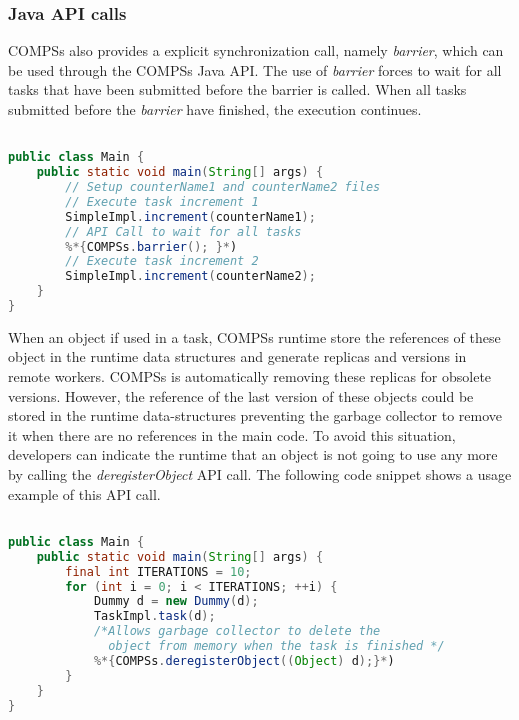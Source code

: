\subsubsection{Java API calls}

COMPSs also provides a explicit synchronization call, namely \textit{barrier}, which can be used through the COMPSs Java API.
The use of \textit{barrier} forces to wait for all tasks that have been submitted before the barrier is called.
When all tasks submitted before the \textit{barrier} have finished, the execution continues.

\begin{lstlisting}[language=java]
%*{\bf import es.bsc.compss.api.COMPSs;}*)

public class Main {
    public static void main(String[] args) {
        // Setup counterName1 and counterName2 files
        // Execute task increment 1
        SimpleImpl.increment(counterName1);
        // API Call to wait for all tasks
        %*{COMPSs.barrier(); }*)
        // Execute task increment 2
        SimpleImpl.increment(counterName2);
    }
}
\end{lstlisting}

When an object if used in a task, COMPSs runtime store the references of these object in the runtime data structures and generate replicas and versions in remote workers. 
COMPSs is automatically removing these replicas for obsolete versions. 
However, the reference of the last version of these objects could be stored in the runtime data-structures preventing the garbage collector to remove it when there are no references in the main code. 
To avoid this situation, developers can indicate the runtime that an object is not going to use any more by calling the \textit{deregisterObject} API call.
The following code snippet shows a usage example of this API call. 

\begin{lstlisting}[language=java]
%*{\bf import es.bsc.compss.api.COMPSs;}*)

public class Main {
    public static void main(String[] args) {
        final int ITERATIONS = 10;
        for (int i = 0; i < ITERATIONS; ++i) {
            Dummy d = new Dummy(d);
            TaskImpl.task(d);
            /*Allows garbage collector to delete the 
              object from memory when the task is finished */     
            %*{COMPSs.deregisterObject((Object) d);}*)
        }
    }
}
\end{lstlisting}

